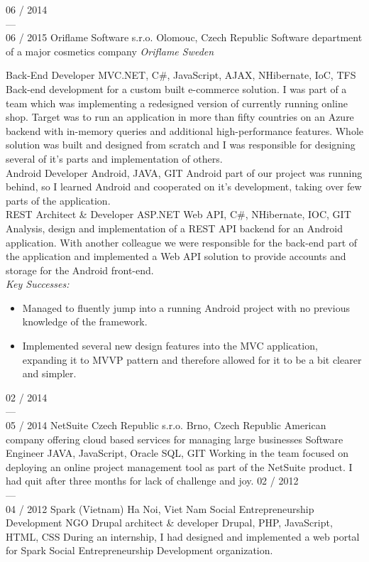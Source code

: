 \documentclass[]{friggeri-cv} %
\begin{document}
\begin{entrylist}
  \job
  {06 / 2014 \\ --- \\ 06 / 2015}
  {Oriflame Software s.r.o.}
  {Olomouc, Czech Republic}
  {Software department of a major cosmetics company \emph{Oriflame Sweden}}
  {
    \position
    {Back-End Developer}
    {MVC.NET, C\#, JavaScript, AJAX, NHibernate, IoC, TFS}
    {Back-end development for a custom built e-commerce solution. I was part of a team which was implementing
    a redesigned version of currently running online shop. Target was to run an application in more than fifty countries
    on an Azure backend with in-memory queries and additional high-performance features. Whole solution was built and
    designed from scratch and I was responsible for designing several of it's parts and implementation of others.}\\
    \position
    {Android Developer}
    {Android, JAVA, GIT}
    {Android part of our project was running behind, so I learned Android and cooperated on it's development, taking
     over few parts of the application.}\\
    \position
    {REST Architect \& Developer}
    {ASP.NET Web API, C\#, NHibernate, IOC, GIT}
    {Analysis, design and implementation of a REST API backend for an Android application. With another colleague
    we were responsible for the back-end part of the application and implemented a Web API solution to provide
    accounts and storage for the Android front-end.}\\
    \emph{Key Successes:}
    \begin{itemize}
      \item Managed to fluently jump into a running Android project with no previous knowledge of the framework.
      \item Implemented several new design features into the MVC application, expanding it to MVVP pattern and therefore
      allowed for it to be a bit clearer and simpler.
    \end{itemize}\medskip
  }
  \job
  {02 / 2014 \\ --- \\ 05 / 2014}
  {NetSuite Czech Republic s.r.o.}
  {Brno, Czech Republic}
  {American company offering cloud based services for managing large businesses}
  {
    \position
    {Software Engineer}
    {JAVA, JavaScript, Oracle SQL, GIT}
    {Working in the team focused on deploying an online project management tool as part of the NetSuite product.
    I had quit after three months for lack of challenge and joy.}
  }
  \job
  {02 / 2012 \\ --- \\ 04 / 2012}
  {Spark (Vietnam)}
  {Ha Noi, Viet Nam}
  {Social Entrepreneurship Development NGO}
  {
    \position
    {Drupal architect \& developer}
    {Drupal, PHP, JavaScript, HTML, CSS}
    {During an internship, I had designed and implemented a web portal for Spark Social Entrepreneurship Development
    organization.}
  }
\end{entrylist}
\end{document}
